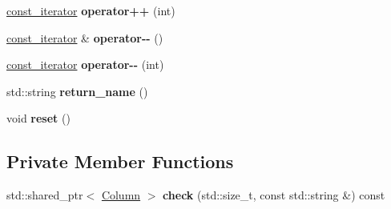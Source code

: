 \begin{DoxyCompactItemize}
\item 
\mbox{\label{classDataFrame_1_1const__iterator_a7f35c88ece82b0cc9c462a5e8f6da5ad}} 
\hyperlink{classDataFrame_1_1const__iterator}{const\+\_\+iterator} {\bfseries operator++} (int)
\item 
\mbox{\label{classDataFrame_1_1const__iterator_aa87a89d3f06a96dc81857a03ff2957e7}} 
\hyperlink{classDataFrame_1_1const__iterator}{const\+\_\+iterator} \& {\bfseries operator-\/-\/} ()
\item 
\mbox{\label{classDataFrame_1_1const__iterator_a924204acc61ca8f36ea2e61a9fe80710}} 
\hyperlink{classDataFrame_1_1const__iterator}{const\+\_\+iterator} {\bfseries operator-\/-\/} (int)
\item 
\mbox{\label{classDataFrame_1_1const__iterator_ab942c86b2711c3175602b19f5df5b469}} 
std\+::string {\bfseries return\+\_\+name} ()
\item 
\mbox{\label{classDataFrame_1_1const__iterator_ad634528efb1faf4afffa48cbcb278a4a}} 
void {\bfseries reset} ()
\end{DoxyCompactItemize}
\subsection*{Private Member Functions}
\begin{DoxyCompactItemize}
\item 
\mbox{\label{classDataFrame_1_1const__iterator_a72503f2c040de96c59d31c51653ff592}} 
std\+::shared\+\_\+ptr$<$ \hyperlink{classColumn}{Column} $>$ {\bfseries check} (std\+::size\+\_\+t, const std\+::string \&) const
\end{DoxyCompactItemize}
